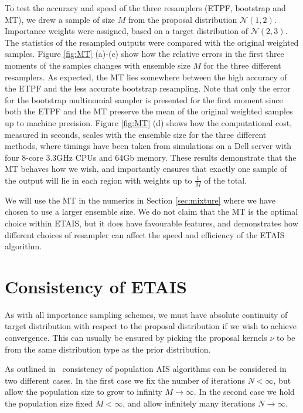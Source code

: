 \documentclass[final]{siamltex}
\newcommand{\revised}{}
\begin{document}
To test the accuracy and speed of the three resamplers (ETPF,
bootstrap and MT), we drew a sample of size $M$ from the proposal distribution
$\mathcal{N}(1,2)$. Importance weights were assigned, based on a
target distribution of $\mathcal{N}(2,3)$. The statistics of the
resampled outputs were compared with the original weighted samples. Figure \ref{fig:MT} (a)-(c) show how the relative errors in the first
three moments of the samples changes with ensemble size $M$ for the three different
resamplers. As expected, the MT lies somewhere between the high
accuracy of the ETPF and the less accurate bootstrap
resampling. Note that only the error for the bootstrap multinomial
sampler is presented for the first moment since both the ETPF and the
MT preserve the mean of the original weighted samples up to machine precision. Figure \ref{fig:MT} (d) shows how the computational cost,
measured in seconds, scales with the ensemble size for the three
different methods, where timings have been taken from simulations on a Dell
server with four 8-core 3.3GHz CPUs and 64Gb memory. These results demonstrate that the MT behaves how we wish, and
importantly ensures that exactly one sample of the output will lie in
each region with weights up to $\frac{1}{M}$ of the total.

We will use the MT in the numerics in Section \ref{sec:mixture}
where we have chosen to use a larger ensemble size. We do not claim
that the MT is the optimal choice within ETAIS, but it does have
favourable features, and demonstrates how different choices of
resampler can affect the speed and efficiency of the ETAIS algorithm.


\section{Consistency of ETAIS}\label{sec:consistency}
{\revised As with all importance sampling schemes, we must have absolute
  continuity of target distribution with respect to the proposal
  distribution if we wish to achieve convergence. This can usually be
  ensured by picking the proposal kernels $\nu$ to be from the same
  distribution type as the prior distribution.}
  
As outlined in~\cite{martino2015adaptive} consistency of population AIS algorithms can be considered in two different cases. In the first case we fix the number of iterations $N < \infty$, but allow the population size to grow to infinity $M\rightarrow\infty$. In the second case we hold the population size fixed $M<\infty$, and allow infinitely many iterations $N\rightarrow\infty$.
\end{document}
